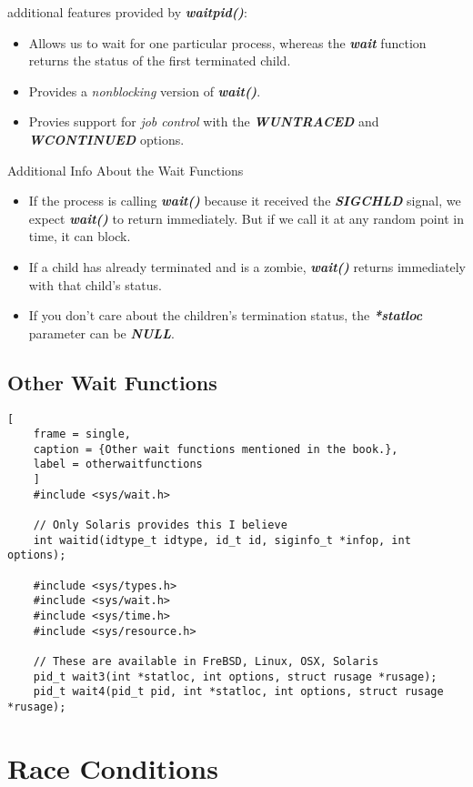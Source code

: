 \documentclass{article}
\newcommand\be[1]{\textbf{\emph{#1}}}
\begin{document}
 additional features provided by \be{waitpid()}:
\begin{itemize}
    \item Allows us to wait for one particular process, whereas the \be{wait} function 
        returns the status of the first terminated child.
    \item Provides a \emph{nonblocking} version of \be{wait()}.
    \item Provies support for \emph{job control} with the \be{WUNTRACED} 
        and \be{WCONTINUED} options.
\end{itemize}
Additional Info About the Wait Functions
\begin{itemize}
    \item If the process is calling \be{wait()} because it received the \be{SIGCHLD}
        signal, we expect \be{wait()} to return immediately. But if we call it at any 
        random point in time, it can block.
    \item If a child has already terminated and is a zombie, \be{wait()} returns
        immediately with that child's status.
    \item If you don't care about the children's termination status, the \be{*statloc} parameter can be \be{NULL}.
\end{itemize}

\subsection{Other Wait Functions}
\begin{lstlisting}[
    frame = single,
    caption = {Other wait functions mentioned in the book.},
    label = otherwaitfunctions
    ]
    #include <sys/wait.h>

    // Only Solaris provides this I believe
    int waitid(idtype_t idtype, id_t id, siginfo_t *infop, int options);

    #include <sys/types.h>
    #include <sys/wait.h>
    #include <sys/time.h>
    #include <sys/resource.h>

    // These are available in FreBSD, Linux, OSX, Solaris
    pid_t wait3(int *statloc, int options, struct rusage *rusage);
    pid_t wait4(pid_t pid, int *statloc, int options, struct rusage *rusage);

\end{lstlisting}

\section{Race Conditions}
\end{document}
